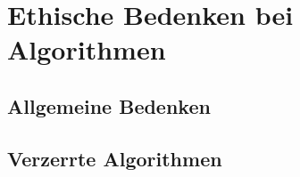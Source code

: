 \chapter{Ethische Bedenken bei Algorithmen}

\section{Allgemeine Bedenken}

\section{Verzerrte Algorithmen}

